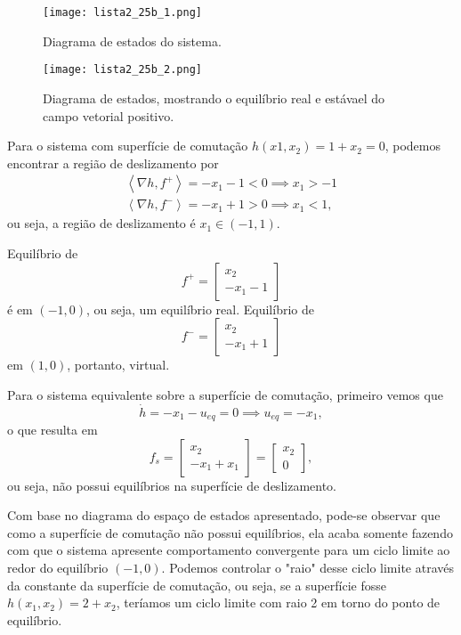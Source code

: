 \documentclass[a4paper]{report}
\begin{document}

\begin{figure}[H]
    \centering
    \texttt{[image: lista2\_25b\_1.png]}
    \caption{Diagrama de estados do sistema.}
    \label{fig:lista2_25b_1-png}
\end{figure}

\begin{figure}[H]
    \centering
    \texttt{[image: lista2\_25b\_2.png]}
    \caption{Diagrama de estados, mostrando o equilíbrio real e estávael do campo vetorial positivo.}
    \label{fig:lista2_25b_2-png}
\end{figure}


Para o sistema com superfície de comutação $h(x1,x_2) = 1+x_2 = 0$, podemos encontrar a região de deslizamento por 
\begin{align*}
    \left< \nabla h, f^{+} \right> = -x_1 -1 <0 \implies x_1 > -1 \\
    \left< \nabla h, f^{-} \right> = -x_1 +1 >0 \implies x_1 < 1
,\end{align*}
ou seja, a região de deslizamento é $x_1\in \left( -1,1 \right)$.

Equilíbrio de \[
f^{+} = \begin{bmatrix} x_2 \\ -x_1 -1 \end{bmatrix}
\] é em $(-1,0)$, ou seja, um equilíbrio real. Equilíbrio de \[
f^{-} = \begin{bmatrix} x_2 \\ -x_1 + 1 \end{bmatrix} 
\] em $(1,0)$, portanto, virtual.

Para o sistema equivalente sobre a superfície de comutação, primeiro vemos que \[
\dot{h} = -x_1 -u_{eq} = 0 \implies u_{eq} = -x_1
,\] o que resulta em \[
f_s = \begin{bmatrix} x_2 \\ -x_1 +x_1 \end{bmatrix} = \begin{bmatrix} x_2 \\ 0 \end{bmatrix} 
,\] ou seja, não possui equilíbrios na superfície de deslizamento.


Com base no diagrama do espaço de estados apresentado, pode-se observar que como a superfície de comutação não possui equilíbrios, ela acaba somente fazendo com que o sistema apresente comportamento convergente para um ciclo limite ao redor do equilíbrio $(-1,0)$. Podemos controlar o "raio" desse ciclo limite através da constante da superfície de comutação, ou seja, se a superfície fosse $h(x_1,x_2) = 2 + x_2$, teríamos um ciclo limite com raio 2 em torno do ponto de equilíbrio.
\end{document}
